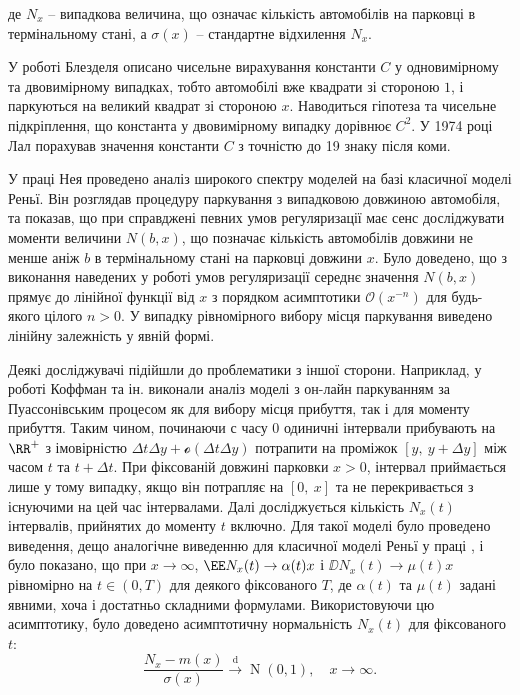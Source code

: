 де $N_{x}$ -- випадкова величина, що означає кількість автомобілів на парковці в термінальному стані, а $\sigma(x)$ -- стандартне відхилення $N_{x}$.

У роботі Блезделя \cite{blaisdell1970} описано чисельне вирахування константи $C$ у одновимірному та двовимірному випадках, тобто автомобілі вже квадрати зі стороною $1$, і паркуються на великий квадрат зі стороною $x$. Наводиться гіпотеза та чисельне підкріплення, що константа у двовимірному випадку дорівнює $C^2$. У 1974 році Лал \cite{lal1970} порахував значення константи $C$ з точністю до 19 знаку після коми.

У праці Нея \cite{ney1962} проведено аналіз широкого спектру моделей на базі класичної моделі Реньї. Він розглядав процедуру паркування з випадковою довжиною автомобіля, та показав, що при справджені певних умов регуляризації має сенс досліджувати моменти величини $N(b,x)$, що позначає кількість автомобілів довжини не менше аніж $b$ в термінальному стані на парковці довжини $x$. Було доведено, що з виконання наведених у роботі умов регуляризації середнє значення $N(b,x)$ прямує до лінійної функції від $x$ з порядком асимптотики $\mathcal{O}(x^{-n})$ для будь-якого цілого $n > 0$. У випадку рівномірного вибору місця паркування виведено лінійну залежність у явній формі.

Деякі досліджувачі підійшли до проблематики з іншої сторони. Наприклад, у роботі \cite{coffman1998parking} Коффман та ін. виконали аналіз моделі з он-лайн паркуванням за Пуассонівським процесом як для вибору місця прибуття, так і для моменту прибуття. Таким чином, починаючи с часу $0$ одиничні інтервали прибувають на $\RR^+$ з імовірністю $\Delta{t}\Delta{y} + \mathcal{o}(\Delta{t}\Delta{y})$ потрапити на проміжок $[y,~y+\Delta y]$ між часом $t$ та $t + \Delta t$. При фіксованій довжині парковки $x > 0$, інтервал приймається лише у тому випадку, якщо він потрапляє на $[0,~x]$ та не перекривається з існуючими на цей час інтервалами. Далі досліджується кількість $N_{x}(t)$ інтервалів, прийнятих до моменту $t$ включно. Для такої моделі було проведено виведення, дещо аналогічне виведенню для класичної моделі Реньї у праці \cite{Dvoretzky}, і було показано, що при $x \rightarrow \infty$, $\EE N_{x}(t) \rightarrow \alpha(t)x$ і $\DD N_{x}(t) \rightarrow \mu(t)x$ рівномірно на $t \in (0, T)$ для деякого фіксованого $T$, де $\alpha(t)$ та $\mu(t)$ задані явними, хоча і достатньо складними формулами. Використовуючи цю асимптотику, було доведено асимптотичну нормальність $N_{x}(t)$ для фіксованого $t$:
\begin{equation}
\frac{N_{x} - m(x)}{\sigma(x)} \xrightarrow{\operatorname{d}} \operatorname{N}(0,1), \quad x \rightarrow \infty.
\end{equation}

